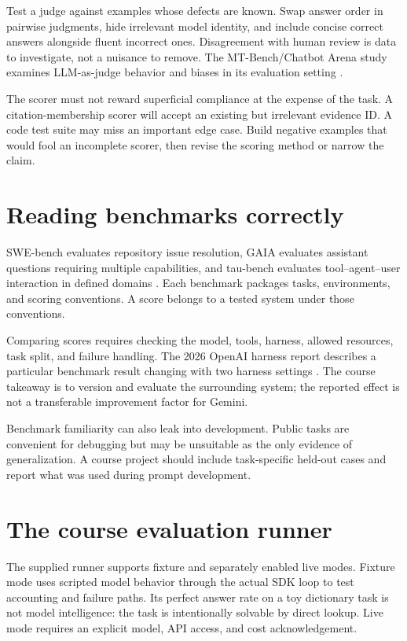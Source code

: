 Test a judge against examples whose defects are known. Swap answer order in pairwise judgments, hide irrelevant model identity, and include concise correct answers alongside fluent incorrect ones. Disagreement with human review is data to investigate, not a nuisance to remove. The MT-Bench/Chatbot Arena study examines LLM-as-judge behavior and biases in its evaluation setting \cite{llm-judge}.

The scorer must not reward superficial compliance at the expense of the task. A citation-membership scorer will accept an existing but irrelevant evidence ID. A code test suite may miss an important edge case. Build negative examples that would fool an incomplete scorer, then revise the scoring method or narrow the claim.

\section{Reading benchmarks correctly}
SWE-bench evaluates repository issue resolution, GAIA evaluates assistant questions requiring multiple capabilities, and tau-bench evaluates tool–agent–user interaction in defined domains \cite{swebench,gaia,tau-bench}. Each benchmark packages tasks, environments, and scoring conventions. A score belongs to a tested system under those conventions.

Comparing scores requires checking the model, tools, harness, allowed resources, task split, and failure handling. The 2026 OpenAI harness report describes a particular benchmark result changing with two harness settings \cite{harness-report}. The course takeaway is to version and evaluate the surrounding system; the reported effect is not a transferable improvement factor for Gemini.

Benchmark familiarity can also leak into development. Public tasks are convenient for debugging but may be unsuitable as the only evidence of generalization. A course project should include task-specific held-out cases and report what was used during prompt development.

\section{The course evaluation runner}
The supplied runner supports fixture and separately enabled live modes. Fixture mode uses scripted model behavior through the actual SDK loop to test accounting and failure paths. Its perfect answer rate on a toy dictionary task is not model intelligence: the task is intentionally solvable by direct lookup. Live mode requires an explicit model, API access, and cost acknowledgement.


